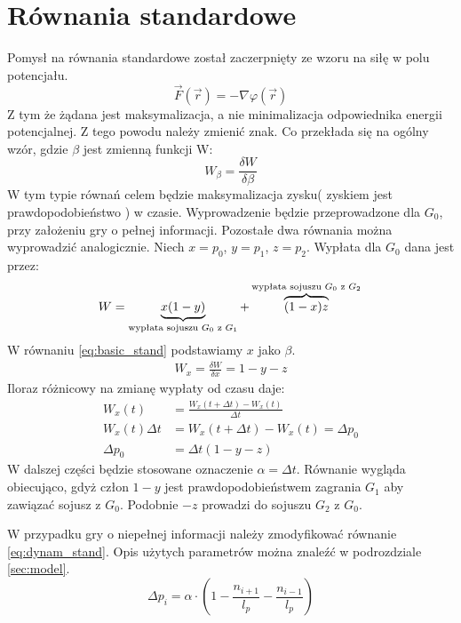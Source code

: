 \section{Równania standardowe}
\label{sec:r_stand}
Pomysł na równania standardowe został zaczerpnięty ze wzoru na siłę w polu potencjału.
\begin{equation}\label{eq:fiz_stand}
\overrightarrow{F}(\overrightarrow{r})=-\nabla \varphi (\overrightarrow{r})
\end{equation}
Z tym że żądana jest maksymalizacja, a nie minimalizacja odpowiednika energii potencjalnej. Z tego powodu należy zmienić znak. Co przekłada się na ogólny wzór, gdzie $\beta$ jest zmienną funkcji W:
\begin{equation}\label{eq:basic_stand}
W_\beta = \frac{\delta W}{\delta \beta}
\end{equation}
W tym typie równań celem będzie maksymalizacja zysku( zyskiem jest prawdopodobieństwo ) w czasie. Wyprowadzenie będzie przeprowadzone dla $G_0$, przy założeniu gry o pełnej informacji. Pozostałe dwa równania można wyprowadzić analogicznie. Niech $x=p_0$, $y=p_1$, $z=p_2$. Wypłata dla $G_0$ dana jest przez:
\begin{equation}\label{eq:wypl_stand}
W = \underbrace{x(1-y)}_{\text{wypłata sojuszu $G_0$ z $G_1$}} + \overbrace{(1-x)z}^{\text{wypłata sojuszu $G_0$ z $G_2$}} \\
\end{equation}
W równaniu \ref{eq:basic_stand} podstawiamy $x$ jako $\beta$.
\begin{align*}
W_x = \frac{\delta W}{\delta x} = 1-y-z
\end{align*}
Iloraz różnicowy na zmianę wypłaty od czasu daje:
\begin{align}\label{eq:dynam_stand}
W_x(t) &= \frac{W_x(t+\Delta t)-W_x(t)}{\Delta t} \nonumber\\
W_x(t) \Delta t &= W_x(t+\Delta t)-W_x(t) = \Delta p_0 \nonumber\\
\Delta p_0 &= \Delta t (1-y-z)
\end{align}
W dalszej części będzie stosowane oznaczenie $\alpha = \Delta t$. Równanie wygląda obiecująco, gdyż człon $1 - y$ jest prawdopodobieństwem zagrania $G_1$ aby zawiązać sojusz z $G_0$. Podobnie $-z$ prowadzi do sojuszu $G_2$ z $G_0$.

W przypadku gry o niepełnej informacji należy zmodyfikować równanie \ref{eq:dynam_stand}. Opis użytych parametrów można znaleźć w podrozdziale \ref{sec:model}.
\begin{equation} \label{eq:stand}
\Delta p_i = \alpha \cdot (1 - \frac{n_{i+1}}{l_p} - \frac{n_{i-1}}{l_p})
\end{equation}

